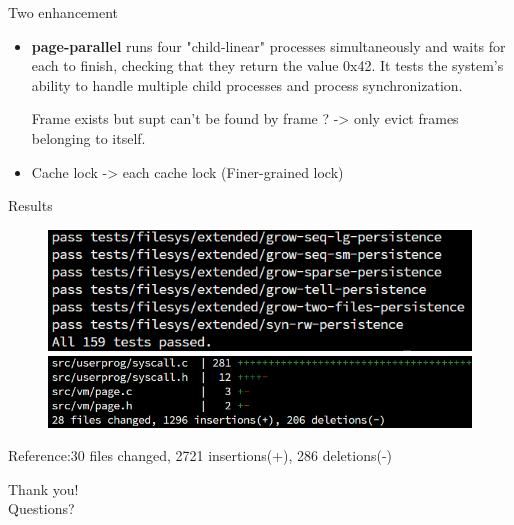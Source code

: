 \documentclass[10pt]{beamer}
\begin{document}
\begin{frame}[fragile]{Two enhancement}
\begin{itemize}
    \item \textbf{page-parallel} runs four "child-linear" processes simultaneously and waits for each to finish, checking that they return the value 0x42. It tests the system's ability to handle multiple child processes and process synchronization.

    Frame exists but supt can't be found by frame ? -> only evict frames belonging to itself.
    \item Cache lock -> each cache lock (Finer-grained lock)
\end{itemize}
\end{frame}
\begin{frame}{Results}
    \begin{figure}
        \centering
        \includegraphics[width=0.8\linewidth]{figures/4.png}
        \includegraphics[width=0.8\linewidth]{figures/diff.png}
    \end{figure}
    Reference:30 files changed, 2721 insertions(+), 286 deletions(-)
\end{frame}
\begin{frame}[standout]
    Thank you!\\
  Questions?
\end{frame}
\end{document}
